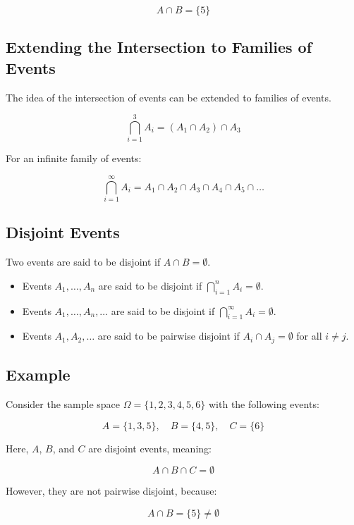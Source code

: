 \documentclass{article}
\begin{document}
\[
A \cap B = \{5\}
\]

\subsection*{Extending the Intersection to Families of Events}

The idea of the intersection of events can be extended to families of events.

\[
\bigcap_{i=1}^{3} A_i = (A_1 \cap A_2) \cap A_3
\]

For an infinite family of events:

\[
\bigcap_{i=1}^{\infty} A_i = A_1 \cap A_2 \cap A_3 \cap A_4 \cap A_5 \cap \ldots
\]


\subsection*{Disjoint Events}

Two events are said to be disjoint if \(A \cap B = \emptyset\).

\begin{itemize}
    \item Events \(A_1, \ldots, A_n\) are said to be disjoint if \(\textstyle \bigcap_{i=1}^{n} A_i = \emptyset \).

    \item Events \(A_1, \ldots, A_n, \ldots\) are said to be disjoint if \(\textstyle \bigcap_{i=1}^{\infty} A_i = \emptyset \).
 
    \item Events \(A_1, A_2, \ldots\) are said to be pairwise disjoint if \(A_i \cap A_j = \emptyset\) for all \(i \neq j\).
\end{itemize}

\subsection*{Example}

Consider the sample space \(\Omega = \{1, 2, 3, 4, 5, 6\}\) with the following events:

\[
A = \{1, 3, 5\}, \quad B = \{4, 5\}, \quad C = \{6\}
\]

Here, \(A\), \(B\), and \(C\) are disjoint events, meaning:

\[
A \cap B \cap C = \emptyset
\]

However, they are not pairwise disjoint, because:

\[
A \cap B = \{5\} \neq \emptyset
\]
\end{document}
